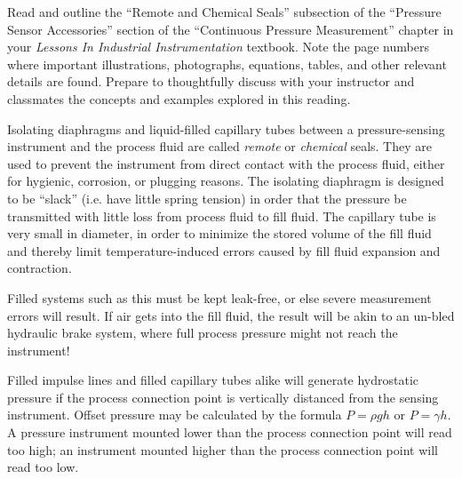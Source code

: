 

Read and outline the ``Remote and Chemical Seals'' subsection of the ``Pressure Sensor Accessories'' section of the ``Continuous Pressure Measurement'' chapter in your {\it Lessons In Industrial Instrumentation} textbook.  Note the page numbers where important illustrations, photographs, equations, tables, and other relevant details are found.  Prepare to thoughtfully discuss with your instructor and classmates the concepts and examples explored in this reading.














Isolating diaphragms and liquid-filled capillary tubes between a pressure-sensing instrument and the process fluid are called {\it remote} or {\it chemical} seals.  They are used to prevent the instrument from direct contact with the process fluid, either for hygienic, corrosion, or plugging reasons.  The isolating diaphragm is designed to be ``slack'' (i.e. have little spring tension) in order that the pressure be transmitted with little loss from process fluid to fill fluid.  The capillary tube is very small in diameter, in order to minimize the stored volume of the fill fluid and thereby limit temperature-induced errors caused by fill fluid expansion and contraction.

\vskip 10pt

Filled systems such as this must be kept leak-free, or else severe measurement errors will result.  If air gets into the fill fluid, the result will be akin to an un-bled hydraulic brake system, where full process pressure might not reach the instrument!

\vskip 10pt

Filled impulse lines and filled capillary tubes alike will generate hydrostatic pressure if the process connection point is vertically distanced from the sensing instrument.  Offset pressure may be calculated by the formula $P = \rho g h$ or $P = \gamma h$.  A pressure instrument mounted lower than the process connection point will read too high; an instrument mounted higher than the process connection point will read too low.

